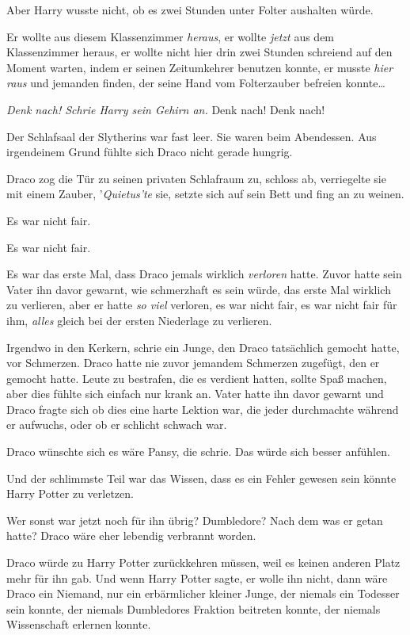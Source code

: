 {Aber Harry wusste nicht, ob es zwei Stunden unter Folter aushalten würde.

Er wollte aus diesem Klassenzimmer \emph{heraus}, er wollte \emph{jetzt} aus dem Klassenzimmer heraus, er wollte nicht hier drin zwei Stunden schreiend auf den Moment warten, indem er seinen Zeitumkehrer benutzen konnte, er musste \emph{hier raus} und jemanden finden, der seine Hand vom Folterzauber befreien konnte…

\emph{Denk nach! Schrie Harry sein Gehirn an.} Denk nach! Denk nach!

Der Schlafsaal der Slytherins war fast leer. Sie waren beim Abendessen. Aus irgendeinem Grund fühlte sich Draco nicht gerade hungrig.

Draco zog die Tür zu seinen privaten Schlafraum zu, schloss ab, verriegelte sie mit einem Zauber, '\emph{Quietus'te} sie, setzte sich auf sein Bett und fing an zu weinen.

Es war nicht fair.

Es war nicht fair.

Es war das erste Mal, dass Draco jemals wirklich \emph{verloren} hatte. Zuvor hatte sein Vater ihn davor gewarnt, wie schmerzhaft es sein würde, das erste Mal wirklich zu verlieren, aber er hatte \emph{so viel} verloren, es war nicht fair, es war nicht fair für ihm, \emph{alles} gleich bei der ersten Niederlage zu verlieren.

Irgendwo in den Kerkern, schrie ein Junge, den Draco tatsächlich gemocht hatte, vor Schmerzen. Draco hatte nie zuvor jemandem Schmerzen zugefügt, den er gemocht hatte. Leute zu bestrafen, die es verdient hatten, sollte Spaß machen, aber dies fühlte sich einfach nur krank an. Vater hatte ihn davor gewarnt und Draco fragte sich ob dies eine harte Lektion war, die jeder durchmachte während er aufwuchs, oder ob er schlicht schwach war.

Draco wünschte sich es wäre Pansy, die schrie. Das würde sich besser anfühlen.

Und der schlimmste Teil war das Wissen, dass es ein Fehler gewesen sein könnte Harry Potter zu verletzen.

Wer sonst war jetzt noch für ihn übrig? Dumbledore? Nach dem was er getan hatte? Draco wäre eher lebendig verbrannt worden.

Draco würde zu Harry Potter zurückkehren müssen, weil es keinen anderen Platz mehr für ihn gab. Und wenn Harry Potter sagte, er wolle ihn nicht, dann wäre Draco ein Niemand, nur ein erbärmlicher kleiner Junge, der niemals ein Todesser sein konnte, der niemals Dumbledores Fraktion beitreten konnte, der niemals Wissenschaft erlernen konnte.

}
